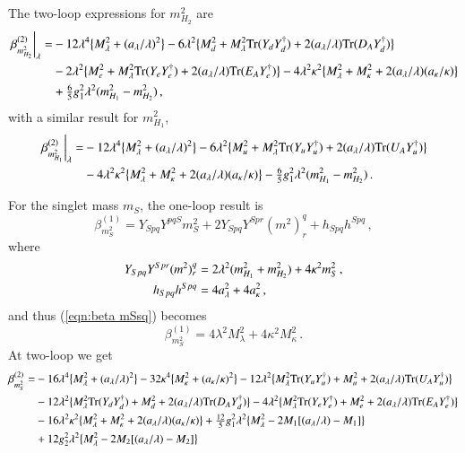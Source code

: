 \documentclass[final,3p,times,pdflatex]{elsarticle}
\newcommand{\lamsq}{\lambda^2}
\newcommand{\kapsq}{\kappa^2}
\newcommand{\tr}{\mathrm{Tr}}
\newcommand{\mhusq}{m^2_{H_2}}
\newcommand{\mhdsq}{m^2_{H_1}}
\newcommand{\mlamsq}{M_\lambda^2}
\newcommand{\mkapsq}{M_\kappa^2}
\newcommand{\Alam}{a_\lambda/\lambda}
\newcommand{\Akap}{a_\kappa/\kappa}
\newcommand{\Musq}{M_u^2}
\newcommand{\Mdsq}{M_d^2}
\newcommand{\Mesq}{M_e^2}
\begin{document}
The two-loop expressions for $m_{H_2}^2$ are 
%
\begin{align}
\left.\beta_{m_{H_2}^2}^{(2)}\right|_\lambda =& -12\lambda^4\big\{ M_\lambda^2 + (\Alam)^2\big\} 
- 6\lamsq\big\{ \Mdsq + M_\lambda^2\tr( Y_d Y_d^\dagger) + 2(a_\lambda/\lambda)\tr( D_A Y_d^\dagger) \big\} \notag \\
%
&-2\lamsq\big\{ \Mesq + M_\lambda^2\tr( Y_e Y_e^\dagger) + 2(a_\lambda/\lambda)\tr( E_A Y_e^\dagger)\big\}
%
-4\lamsq\kapsq\big\{ M_\lambda^2 + M_\kappa^2 + 2(a_\lambda/\lambda)(a_\kappa/\kappa) \big\}  \notag \\
%
&+ \tfrac{6}{5}g_1^2\lamsq(\mhdsq-\mhusq) \,,
\end{align}
%
with a similar result for $m_{H_1}^2$,
%
\begin{align}
\left.\beta_{m_{H_1}^2}^{(2)}\right|_\lambda =& -12\lambda^4\big\{M_\lambda^2 + (\Alam)^2\big\} 
- 6\lamsq\big\{ \Musq + M_\lambda^2\tr( Y_u Y_u^\dagger) + 2(a_\lambda/\lambda)\tr( U_A Y_u^\dagger) \big\} \notag \\
%
&-4\lamsq\kapsq\big\{ M_\lambda^2 + M_\kappa^2 + 2(a_\lambda/\lambda)(a_\kappa/\kappa) \big\} 
- \tfrac{6}{5}g_1^2\lamsq(\mhdsq-\mhusq)\,.
\end{align}

For the singlet mass $m_S$, the one-loop result is
%
\begin{equation}
\beta_{m_S^2}^{(1)} = Y_{Spq}Y^{pqS}m_S^2 + 2Y_{Spq}Y^{Spr}(m^2)^q_r + h_{Spq}h^{Spq}\,, \label{eqn:beta mSsq}
\end{equation}
%
where 
%
\begin{align}
Y_{Spq}Y^{Spr}(m^2)^q_r &= 2\lamsq(\mhdsq + \mhusq) + 4\kapsq m_S^2\,, \notag \\
%
h_{Spq}h^{Spq} &= 4a_\lambda^2 + 4a_\kappa^2\,,
\end{align}
%
and thus (\ref{eqn:beta mSsq}) becomes
%
\begin{equation}
\beta_{m_S^2}^{(1)} = 4\lamsq \mlamsq + 4\kapsq \mkapsq\,.
\end{equation}
%
At two-loop we get
\begin{align}
\beta_{m_S^2}^{(2)} =& -16\lambda^4\big\{ \mlamsq + (\Alam)^2\big\} - 32\kappa^4\big\{ \mkapsq + (\Akap)^2\big\}
-12\lamsq\big\{ \mlamsq\tr( Y_u Y_u^\dagger) + \Musq + 2(\Alam)\tr( U_A Y_u^\dagger)\big\} \notag \\
%
&- 12\lamsq\big\{ \mlamsq\tr( Y_d Y_d^\dagger) + \Mdsq + 2(\Alam)\tr( D_A Y_d^\dagger) \big\} 
- 4\lamsq\big\{ \mlamsq\tr( Y_e Y_e^\dagger) + \Mesq + 2(\Alam)\tr( E_A Y_e^\dagger) \big\} \notag \\
%
&- 16\lamsq\kapsq\big\{ \mlamsq + \mkapsq + 2(\Alam)(\Akap) \big\}
+ \tfrac{12}{5}g_1^2\lamsq \big\{ \mlamsq - 2M_1[(\Alam) - M_1] \big\} \notag \\
%
&+ 12g_2^2\lamsq\big\{ \mlamsq -2M_2[(\Alam) - M_2]\big\}
\end{align}
\end{document}
